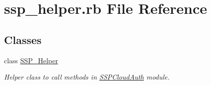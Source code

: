 \hypertarget{ssp__helper_8rb}{
\section{\-s\-s\-p\_\-\-h\-e\-l\-p\-e\-r.rb File Reference}
\label{ssp__helper_8rb}
}
\subsection*{Classes}
\begin{DoxyCompactItemize}
\item 
class \hyperlink{classSSP__Helper}{\-S\-S\-P\_\-\-H\-e\-l\-p\-e\-r}
\begin{DoxyCompactList}\small\item\em Helper class to call methods in \hyperlink{namespaceSSPCloudAuth}{\-S\-S\-P\-C\-l\-o\-u\-d\-A\-u\-t\-h} module. \end{DoxyCompactList}\end{DoxyCompactItemize}
